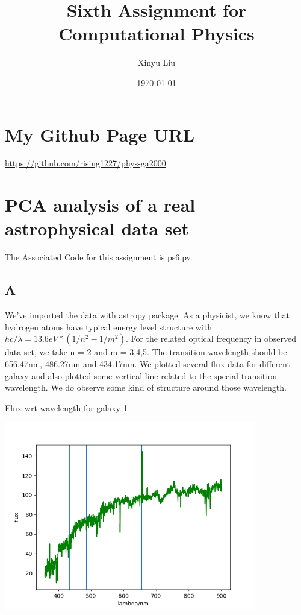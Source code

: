\documentclass[letterpaper,12pt]{article}
\title{Sixth Assignment for Computational Physics}
\date{\today}
\author{Xinyu Liu}
\begin{document}
\maketitle
\tableofcontents

\newpage

\section{My Github Page URL}
\url{https://github.com/rising1227/phys-ga2000}

\section{PCA analysis of a real astrophysical data set}

The Associated Code for this assignment is ps6.py.

\subsection{A}

We've imported the data with astropy package. As a physicist, we know that hydrogen atoms have typical energy level structure with $hc/\lambda = 13.6eV*(1/n^2 - 1/m^2)$. For the related optical frequency in observed data set, we take n = 2 and m = 3,4,5. The transition wavelength should be 656.47nm, 486.27nm and 434.17nm. We plotted several flux data for different galaxy and also plotted some vertical line related to the special transition wavelength. We do observe some kind of structure around those wavelength.

\begin{table}[!h]
    \centering
    \caption{Flux wrt wavelength for galaxy 1}
    \includegraphics[width=11cm]{7-1-0.png}
\end{table}%
\end{document}
